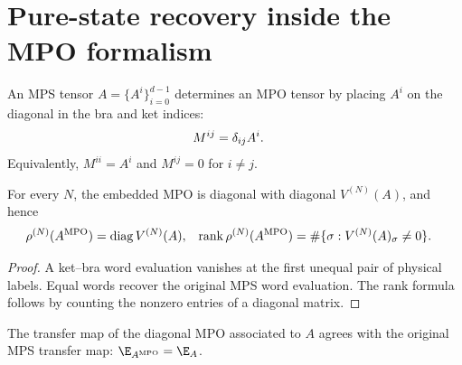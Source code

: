 \section{Pure-state recovery inside the MPO formalism}

\begin{definition}\label{def:to_mpo_tensor}
    \leanok
    An MPS tensor $A=\{A^i\}_{i=0}^{d-1}$ determines an MPO tensor by
    placing $A^i$ on the diagonal in the bra and ket indices:
    \begin{align}
        M^{ij} & =\delta_{ij}A^i.
        \notag
    \end{align}
    Equivalently, $M^{ii}=A^i$ and $M^{ij}=0$ for $i\ne j$.
\end{definition}

\begin{lemma}
    \label{thm:to_mpo_diagonal_rank}
    \leanok
    For every $N$, the embedded MPO is diagonal with diagonal
    $V^{(N)}(A)$, and hence
    \begin{align}
        \rho^{(N)}(A^{\mathrm{MPO}})
         & =\operatorname{diag}V^{(N)}(A),      &
        \operatorname{rank}\rho^{(N)}(A^{\mathrm{MPO}})
         & =\#\{\sigma:V^{(N)}(A)_\sigma\ne0\}.
        \notag
    \end{align}
\end{lemma}

\begin{proof}
    \leanok
    A ket--bra word evaluation vanishes at the first unequal pair of physical
    labels.  Equal words recover the original MPS word evaluation.  The rank
    formula follows by counting the nonzero entries of a diagonal matrix.
\end{proof}

\begin{lemma}%
    \label{thm:to_mpo_transfer_map}
    \leanok
    The transfer map of the diagonal MPO associated to $A$ agrees with the
    original MPS transfer map: $\E_{A^{\mathrm{MPO}}}=\E_A$.
\end{lemma}

